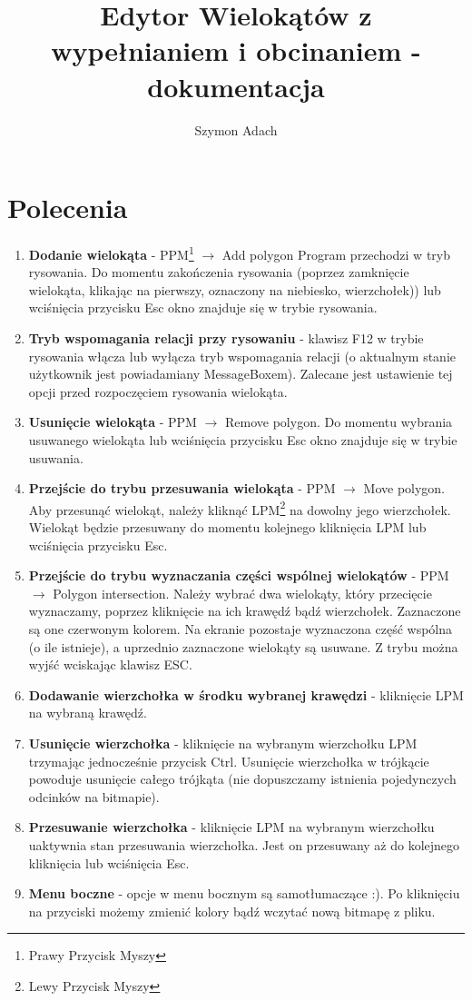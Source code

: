 \documentclass[]{article}
\title{Edytor Wielokątów z wypełnianiem i obcinaniem - dokumentacja}
\author{Szymon Adach}
\begin{document}
\maketitle

\section{Polecenia}
\begin{enumerate}
	\item \textbf{Dodanie wielokąta} - PPM\footnote{Prawy Przycisk Myszy} $\rightarrow$ Add polygon \newline
	Program przechodzi w tryb rysowania. Do momentu zakończenia rysowania (poprzez zamknięcie wielokąta, klikając na pierwszy, oznaczony na niebiesko, wierzchołek)) lub wciśnięcia przycisku Esc okno znajduje się w trybie rysowania.
	\item \textbf{Tryb wspomagania relacji przy rysowaniu} - klawisz F12 w trybie rysowania włącza lub wyłącza tryb wspomagania relacji (o aktualnym stanie użytkownik jest powiadamiany MessageBoxem). Zalecane jest ustawienie tej opcji przed rozpoczęciem rysowania wielokąta.
	\item \textbf{Usunięcie wielokąta} - PPM $\rightarrow$ Remove polygon.
	Do momentu wybrania usuwanego wielokąta lub wciśnięcia przycisku Esc okno znajduje się w trybie usuwania.
	\item \textbf{Przejście do trybu przesuwania wielokąta} - PPM $\rightarrow$ Move polygon. \newline
	Aby przesunąć wielokąt, należy kliknąć LPM\footnote{Lewy Przycisk Myszy} na dowolny jego wierzchołek. Wielokąt będzie przesuwany do momentu kolejnego kliknięcia LPM lub wciśnięcia przycisku Esc.
	\item \textbf{Przejście do trybu wyznaczania części wspólnej wielokątów} - PPM $\rightarrow$ Polygon intersection. \newline
	Należy wybrać dwa wielokąty, który przecięcie wyznaczamy, poprzez kliknięcie na ich krawędź bądź wierzchołek. Zaznaczone są one czerwonym kolorem. Na ekranie pozostaje wyznaczona część wspólna (o ile istnieje), a uprzednio zaznaczone wielokąty są usuwane. Z trybu można wyjść wciskając klawisz ESC.
	\item \textbf{Dodawanie wierzchołka w środku wybranej krawędzi} - kliknięcie LPM na wybraną krawędź.
	\item \textbf{Usunięcie wierzchołka} - kliknięcie na wybranym wierzchołku LPM trzymając jednocześnie przycisk Ctrl. Usunięcie wierzchołka w trójkącie powoduje usunięcie całego trójkąta (nie dopuszczamy istnienia pojedynczych odcinków na bitmapie).
	\item \textbf{Przesuwanie wierzchołka} - kliknięcie LPM na wybranym wierzchołku uaktywnia stan przesuwania wierzchołka. Jest on przesuwany aż do kolejnego kliknięcia lub wciśnięcia Esc.
	\item \textbf{Menu boczne} - opcje w menu bocznym są samotłumaczące :). Po kliknięciu na przyciski możemy  zmienić kolory bądź wczytać nową bitmapę z pliku.
\end{enumerate}
\end{document}
